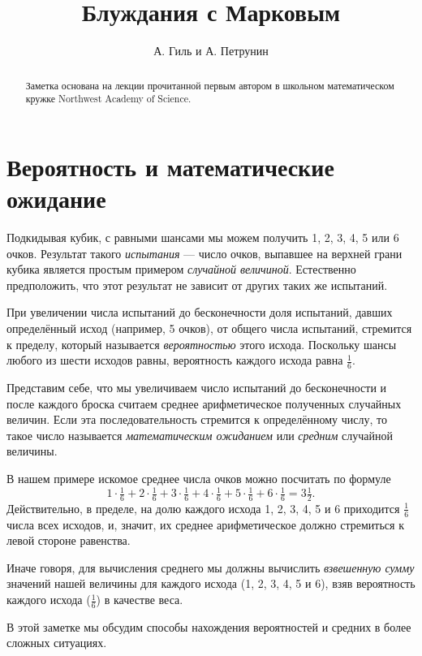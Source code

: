 \documentclass{article}
\begin{document}
\title{Блуждания с Марковым}
\author{А. Гиль и А. Петрунин}
\date{}
\maketitle
\begin{abstract}
Заметка основана на лекции прочитанной первым автором в школьном 
математическом кружке Northwest Academy of Science.
\end{abstract}

\section{Вероятность и математические ожидание}

Подкидывая кубик,
с равными шансами мы можем получить 1, 2, 3, 4, 5 или 6 очков.
Результат такого \emph{испытания} --- число очков, выпавшее на 
верхней грани кубика является простым примером \emph{случайной величиной}.
Естественно предположить, что этот результат не зависит от других таких же испытаний.

При увеличении числа испытаний до бесконечности 
доля испытаний, давших определённый исход (например, 5 очков), 
от общего числа испытаний, стремится к пределу, 
который называется \emph{вероятностью} этого исхода.
Поскольку шансы любого из шести исходов равны,
вероятность каждого исхода равна $\tfrac16$.

Представим себе, что мы увеличиваем число испытаний до бесконечности
и после каждого броска считаем среднее арифметическое полученных случайных величин.
Если эта последовательность стремится к определённому числу,
то такое число называется \emph{математическим ожиданием} или \emph{средним} случайной величины.

В нашем примере искомое среднее числа очков можно посчитать по формуле
\[1\cdot\tfrac16+2\cdot\tfrac16+3\cdot\tfrac16+4\cdot\tfrac16+5\cdot\tfrac16+6\cdot\tfrac16=3\tfrac12.\]
Действительно, в пределе, 
на долю каждого исхода 1, 2, 3, 4, 5 и 6
приходится $\tfrac16$ числа всех исходов, 
и, значит, их среднее арифметическое должно 
стремиться к левой стороне равенства.

Иначе говоря, для вычисления среднего мы должны вычислить \emph{взвешенную сумму} значений нашей величины для каждого исхода
(1, 2, 3, 4, 5 и 6), 
взяв вероятность каждого исхода ($\tfrac16$)
в качестве веса.

В этой заметке мы обсудим способы нахождения 
вероятностей и средних в более сложных ситуациях.
\end{document}
